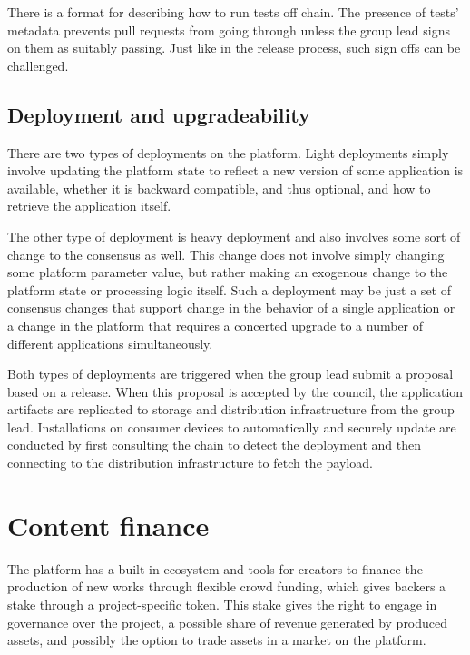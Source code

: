 \documentclass{article}
\begin{document}
There is a format for describing how to run tests off chain. The presence of tests' metadata prevents pull requests from going through unless the group lead signs on them as suitably passing. Just like in the release process, such sign offs can be challenged.


\subsection{Deployment and upgradeability}

There are two types of deployments on the platform. Light deployments simply involve updating the platform state to reflect a new version of some application is available, whether it is backward compatible, and thus optional, and how to retrieve the application itself.

The other type of deployment is heavy deployment and also involves some sort of change to the consensus as well. This change does not involve simply changing some platform parameter value, but rather making an exogenous change to the platform state or processing logic itself. Such a deployment may be just a set of consensus changes that support change in the behavior of a single application or a change in the platform that requires a concerted upgrade to a number of different applications simultaneously.

Both types of deployments are triggered when the group lead submit a proposal based on a release. When this proposal is accepted by the council, the application artifacts are replicated to storage and distribution infrastructure from the group lead. Installations on consumer devices to automatically and securely update are conducted by first consulting the chain to detect the deployment and then connecting to the distribution infrastructure to fetch the payload.


\section{Content finance} \label{sec:content_finance}

The platform has a built-in ecosystem and tools for creators to finance the production of new works through flexible crowd funding, which gives backers a stake through a project-specific token. This stake gives the right to engage in governance over the project, a possible share of revenue generated by produced assets, and possibly the option to trade assets in a market on the platform.
\end{document}
